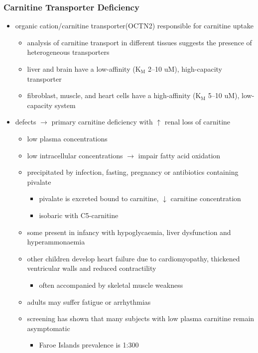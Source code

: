 \documentclass{scrartcl}
\begin{document}
\subsubsection{Carnitine Transporter Deficiency}
\label{sec:org5009bcb}
\begin{itemize}
\item organic cation/carnitine transporter(OCTN2) responsible for
carnitine uptake
\begin{itemize}
\item analysis of carnitine transport in different tissues suggests the
presence of heterogeneous transporters
\item liver and brain have a low-affinity (K\(_{\text{M}}\) 2–10 uM), high-capacity transporter
\item fibroblast, muscle, and heart cells have a high-affinity (K\(_{\text{M}}\) 5–10 uM), low-capacity system
\end{itemize}
\item defects \(\to\) primary carnitine deficiency with \(\uparrow\) renal loss of carnitine
\begin{itemize}
\item low plasma concentrations
\item low intracellular concentrations \(\to\) impair fatty acid oxidation
\end{itemize}
\begin{itemize}
\item precipitated by infection, fasting, pregnancy or antibiotics containing pivalate
\begin{itemize}
\item pivalate is excreted bound to carnitine, \(\downarrow\) carnitine concentration
\item isobaric with C5-carnitine
\end{itemize}
\item some present in infancy with hypoglycaemia, liver dysfunction and hyperammonaemia
\item other children develop heart failure due to cardiomyopathy,
thickened ventricular walls and reduced contractility
\begin{itemize}
\item often accompanied by skeletal muscle weakness
\end{itemize}
\item adults may suffer fatigue or arrhythmias
\item screening has shown that many subjects with low plasma carnitine remain asymptomatic
\begin{itemize}
\item Faroe Islands prevalence is 1:300
\end{itemize}
\end{itemize}
\end{itemize}
\end{document}
